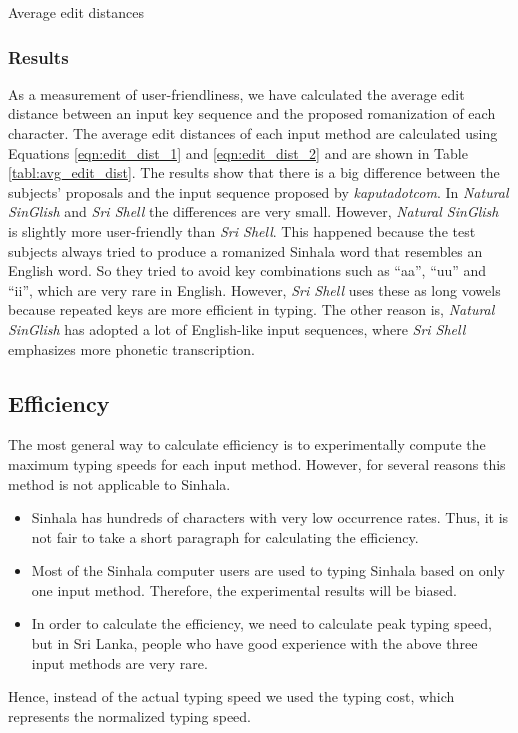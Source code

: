 \documentclass[english]{jnlp_1.3e}
\begin{document}
\begin{table}[t]
\centering
\caption{Average edit distances }
\label{tabl:avg_edit_dist}

\end{table}

    \subsubsection*{Results}
As a measurement of user-friendliness, we have calculated the average edit distance between  an  input key sequence and  the  proposed romanization of each character. 
The average edit distances of each input method are calculated using  Equations \ref{eqn:edit_dist_1} and \ref{eqn:edit_dist_2} and are  shown in Table \ref{tabl:avg_edit_dist}.
The results show that there is a big difference between the subjects' proposals and  the  input sequence proposed by {\it kaputadotcom}. 
In {\it Natural SinGlish} and {\it Sri Shell} the differences are very small. 
However,  {\it Natural SinGlish} is slightly more user-friendly than {\it Sri Shell}. This happened because the test subjects always tried to produce a romanized Sinhala word that resembles an English word. So they tried to avoid key combinations such as ``aa'', ``uu'' and ``ii'', which are very rare in English.
 However,  {\it Sri Shell} uses these as long vowels because repeated keys are more efficient in typing.
The other reason is, {\it Natural SinGlish} has adopted a lot of English-like input sequences, where {\it Sri Shell} emphasizes  more phonetic  transcription.



\subsection{Efficiency}

The most general way to calculate efficiency is to experimentally compute the maximum typing speeds for each input method. 
However,  for several reasons this method is not applicable to Sinhala.
\begin{itemize}
\item  Sinhala has  hundreds of characters with very low occurrence  rates. Thus,  it is not fair to take a short paragraph for calculating the efficiency.
\item Most of the Sinhala computer users are used to typing Sinhala based on only one input method. Therefore,  the experimental results will be biased. 
\item In order to calculate the efficiency,  we need to calculate peak typing speed, but in Sri Lanka, people who have good experience  with  the above three input methods are very rare.
\end{itemize}
Hence, instead of the actual typing speed we used the typing cost, which represents the normalized typing speed.
\end{document}
